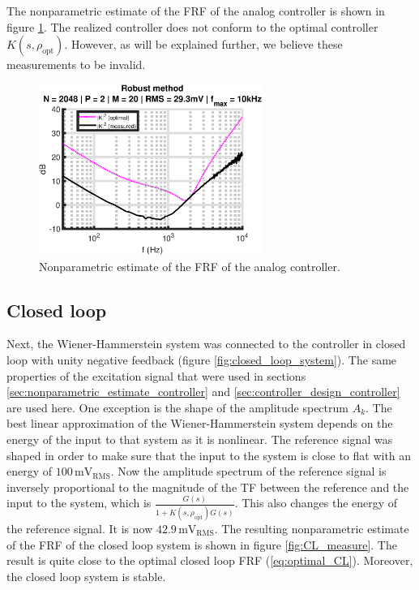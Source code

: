 \newpage
The nonparametric estimate of the FRF of the analog controller is shown in figure \ref{fig:controller_nonparam_measure}. The realized controller does not conform to the optimal controller $K(s,\rho_{\mathrm{opt}})$. However, as will be explained further, we believe these measurements to be invalid.

\begin{figure}[H]
\centering
\includegraphics[width = 0.65\textwidth]{figures/robust_method_K.eps}
\caption{Nonparametric estimate of the FRF of the analog controller.}
\label{fig:controller_nonparam_measure}
\end{figure}

\newpage
\subsection{Closed loop}
Next, the Wiener-Hammerstein system was connected to the controller in closed loop with unity negative feedback (figure \ref{fig:closed_loop_system}). The same properties of the excitation signal that were used in sections \ref{sec:nonparametric_estimate_controller} and \ref{sec:controller_design_controller} are used here. One exception is the shape of the amplitude spectrum $A_k$. The best linear approximation of the Wiener-Hammerstein system depends on the energy of the input to that system as it is nonlinear. The reference signal was shaped in order to make sure that the input to the system is close to flat with an energy of $100 \, \mathrm{mV}_\mathrm{RMS}$. Now the amplitude spectrum of the reference signal is inversely proportional to the magnitude of the TF between the reference and the input to the system, which is $\frac{G(s)}{1+K(s,\rho_\mathrm{opt}) G(s)}$. This also changes the energy of the reference signal. It is now $42.9 \, \mathrm{mV}_\mathrm{RMS}$. The resulting nonparametric estimate of the FRF of the closed loop system is shown in figure \ref{fig:CL_measure}. The result is quite close to the optimal closed loop FRF (\ref{eq:optimal_CL}). Moreover, the closed loop system is stable.

